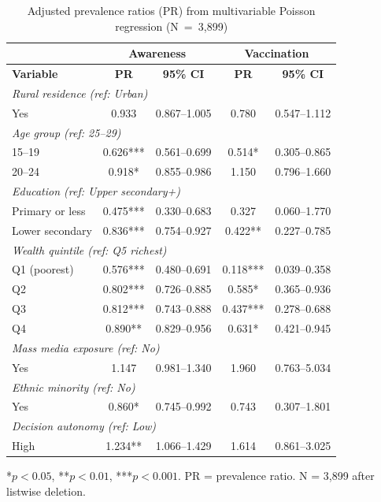 \begin{table}[htbp]
\caption{Adjusted prevalence ratios (PR) from multivariable Poisson regression (N~=~3,899)}
\centering
\small
\begin{tabular}{|p{3.5cm}|c|c|c|c|}
\hline
 & \multicolumn{2}{c|}{\textbf{Awareness}} & \multicolumn{2}{c|}{\textbf{Vaccination}} \\
\hline
\textbf{Variable} & \textbf{PR} & \textbf{95\% CI} & \textbf{PR} & \textbf{95\% CI} \\
\hline
\multicolumn{5}{|l|}{\textit{Rural residence (ref: Urban)}} \\
\hline
Yes & 0.933 & 0.867--1.005 & 0.780 & 0.547--1.112 \\
\hline
\multicolumn{5}{|l|}{\textit{Age group (ref: 25--29)}} \\
\hline
15--19 & 0.626*** & 0.561--0.699 & 0.514* & 0.305--0.865 \\
20--24 & 0.918* & 0.855--0.986 & 1.150 & 0.796--1.660 \\
\hline
\multicolumn{5}{|l|}{\textit{Education (ref: Upper secondary+)}} \\
\hline
Primary or less & 0.475*** & 0.330--0.683 & 0.327 & 0.060--1.770 \\
Lower secondary & 0.836*** & 0.754--0.927 & 0.422** & 0.227--0.785 \\
\hline
\multicolumn{5}{|l|}{\textit{Wealth quintile (ref: Q5 richest)}} \\
\hline
Q1 (poorest) & 0.576*** & 0.480--0.691 & 0.118*** & 0.039--0.358 \\
Q2 & 0.802*** & 0.726--0.885 & 0.585* & 0.365--0.936 \\
Q3 & 0.812*** & 0.743--0.888 & 0.437*** & 0.278--0.688 \\
Q4 & 0.890** & 0.829--0.956 & 0.631* & 0.421--0.945 \\
\hline
\multicolumn{5}{|l|}{\textit{Mass media exposure (ref: No)}} \\
\hline
Yes & 1.147 & 0.981--1.340 & 1.960 & 0.763--5.034 \\
\hline
\multicolumn{5}{|l|}{\textit{Ethnic minority (ref: No)}} \\
\hline
Yes & 0.860* & 0.745--0.992 & 0.743 & 0.307--1.801 \\
\hline
\multicolumn{5}{|l|}{\textit{Decision autonomy (ref: Low)}} \\
\hline
High & 1.234** & 1.066--1.429 & 1.614 & 0.861--3.025 \\
\hline
\end{tabular}
\label{tab:poisson}

\vspace{0.3cm}
\footnotesize{*$p<0.05$, **$p<0.01$, ***$p<0.001$. PR = prevalence ratio. N = 3,899 after listwise deletion.}
\end{table}

